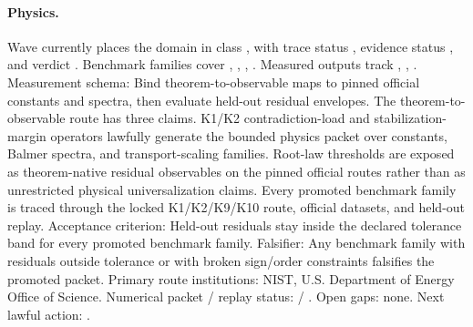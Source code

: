 \paragraph{Physics.}
Wave  currently places the domain in class , with trace status , evidence status , and verdict .
Benchmark families cover , \allowbreak {}, \allowbreak {}, \allowbreak {}.
Measured outputs track , \allowbreak {}, \allowbreak {}.
Measurement schema: Bind theorem-to-observable maps to pinned official constants and spectra, then evaluate held-out residual envelopes.
The theorem-to-observable route has three claims. K1/K2 contradiction-load and stabilization-margin operators lawfully generate the bounded physics packet over constants, Balmer spectra, and transport-scaling families. Root-law thresholds are exposed as theorem-native residual observables on the pinned official routes rather than as unrestricted physical universalization claims. Every promoted benchmark family is traced through the locked K1/K2/K9/K10 route, official datasets, and held-out replay.
Acceptance criterion: Held-out residuals stay inside the declared tolerance band for every promoted benchmark family.
Falsifier: Any benchmark family with residuals outside tolerance or with broken sign/order constraints falsifies the promoted packet.
Primary route institutions: NIST, \allowbreak U.S. Department of Energy Office of Science.
Numerical packet / replay status:  / .
Open gaps: none.
Next lawful action: .

